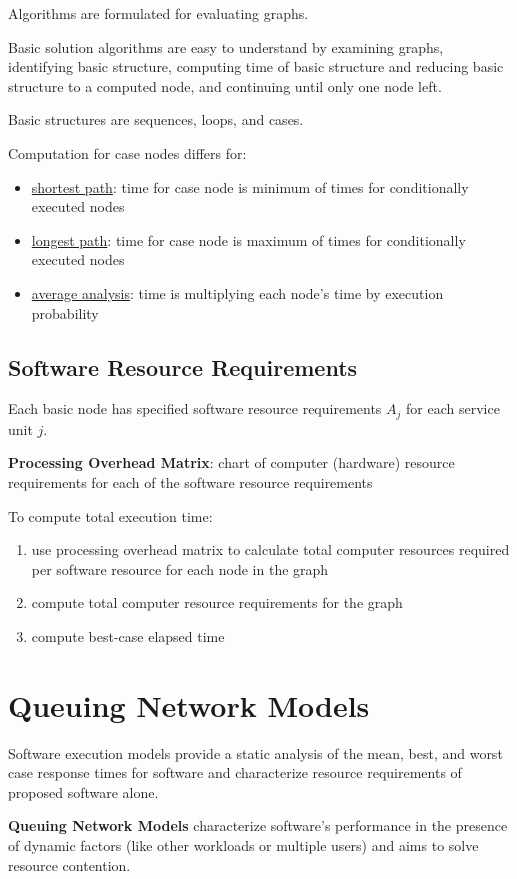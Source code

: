 \documentclass[11pt]{article}
\begin{document}
Algorithms are formulated for evaluating graphs.

Basic solution algorithms are easy to understand by examining graphs,
identifying basic structure, computing time of basic structure and
reducing basic structure to a computed node, and continuing until only
one node left.

Basic structures are sequences, loops, and cases.

Computation for case nodes differs for:
\begin{itemize}
\item \uline{shortest path}: time for case node is minimum of times for
conditionally executed nodes
\item \uline{longest path}: time for case node is maximum of times for
conditionally executed nodes
\item \uline{average analysis}: time is multiplying each node's time by
execution probability
\end{itemize}
\subsection{Software Resource Requirements}
\label{sec:org5fb967a}
Each basic node has specified software resource requirements \(A_{j}\)
for each service unit \(j\).

\textbf{Processing Overhead Matrix}: chart of computer (hardware) resource requirements for each
of the software resource requirements

To compute total execution time:
\begin{enumerate}
\item use processing overhead matrix to calculate total computer resources required per
software resource for each node in the graph
\item compute total computer resource requirements for the graph
\item compute best-case elapsed time
\end{enumerate}
\section{Queuing Network Models}
\label{sec:orgb6a1a22}
Software execution models provide a static analysis of the mean, best, and worst case
response times for software and characterize resource requirements of proposed software alone.

\textbf{Queuing Network Models} characterize software's performance in the presence of
dynamic factors (like other workloads or multiple users) and aims to solve resource
contention.
\end{document}
